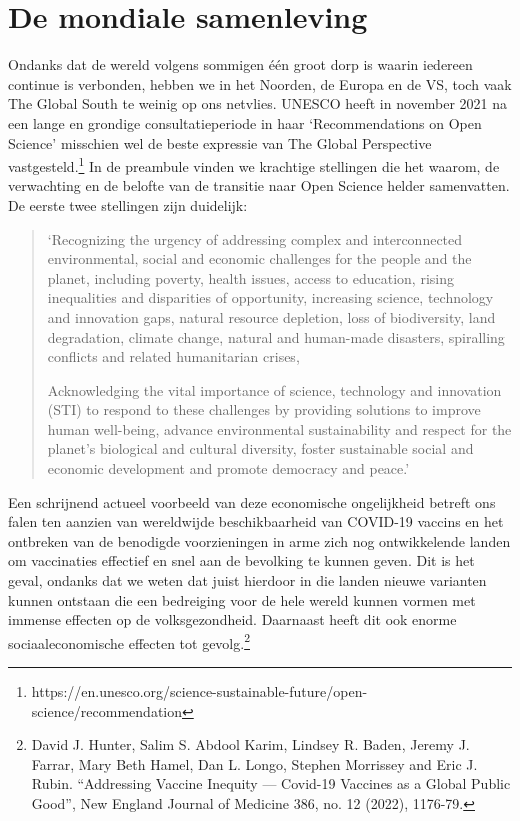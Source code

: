 \documentclass[empirical, authordate, ]{new-jote-article}
\begin{document}
	\section{De mondiale samenleving}



	Ondanks dat de wereld volgens sommigen één groot dorp is waarin iedereen continue is verbonden, hebben we in het Noorden, de Europa en de VS, toch vaak The Global South te weinig op ons netvlies. UNESCO heeft in november 2021 na een lange en grondige consultatieperiode in haar ‘Recommendations on Open Science' misschien wel de beste expressie van The Global Perspective vastgesteld.\footnote{https://en.unesco.org/science-sustainable-future/open-science/recommendation} In de preambule vinden we krachtige stellingen die het waarom, de verwachting en de belofte van de transitie naar Open Science helder samenvatten. De eerste twee stellingen zijn duidelijk:

	\begin{quote}
		\itshape

		‘Recognizing the urgency of addressing complex and interconnected environmental, social and economic challenges for the people and the planet, including poverty, health issues, access to education, rising inequalities and disparities of opportunity, increasing science, technology and innovation gaps, natural resource depletion, loss of biodiversity, land degradation, climate change, natural and human-made disasters, spiralling conflicts and related humanitarian crises,

		Acknowledging the vital importance of science, technology and innovation (STI) to respond to these challenges by providing solutions to improve human well-being, advance environmental sustainability and respect for the planet's biological and cultural diversity, foster sustainable social and economic development and promote democracy and peace.'
	\end{quote}

	Een schrijnend actueel voorbeeld van deze economische ongelijkheid betreft ons falen ten aanzien van wereldwijde beschikbaarheid van COVID-19 vaccins en het ontbreken van de benodigde voorzieningen in arme zich nog ontwikkelende landen om vaccinaties effectief en snel aan de bevolking te kunnen geven. Dit is het geval, ondanks dat we weten dat juist hierdoor in die landen nieuwe varianten kunnen ontstaan die een bedreiging voor de hele wereld kunnen vormen met immense effecten op de volksgezondheid. Daarnaast heeft dit ook enorme sociaaleconomische effecten tot gevolg.\footnote{David J. Hunter, Salim S. Abdool Karim, Lindsey R. Baden, Jeremy J. Farrar, Mary Beth Hamel, Dan L. Longo, Stephen Morrissey and Eric J. Rubin. “Addressing Vaccine Inequity — Covid-19 Vaccines as a Global Public Good”, New England Journal of Medicine 386, no. 12 (2022), 1176-79. }
\end{document}
